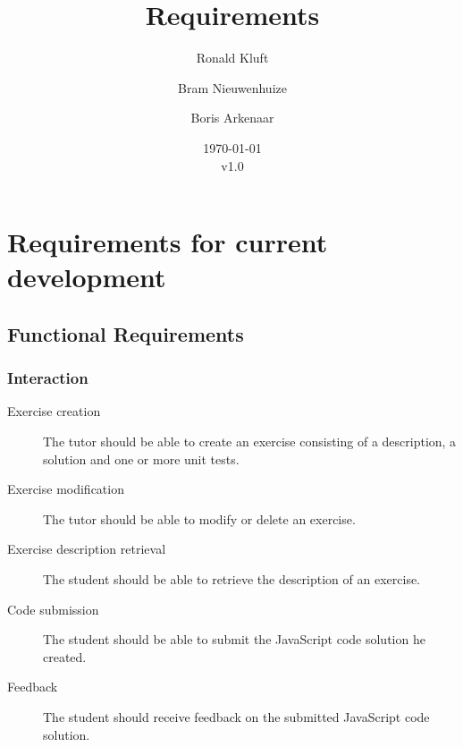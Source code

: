 \documentclass{article}
\begin{document}
\title{Requirements}
\author{Ronald Kluft \and Bram Nieuwenhuize \and Boris Arkenaar}
\date{\today\\v1.0}
\maketitle

\section{Requirements for current development}
\subsection{Functional Requirements}
\subsubsection{Interaction}
\begin{description}
  \item[Exercise creation] The tutor should be able to create an exercise
    consisting of a description, a solution and one or more unit tests.
  \item[Exercise modification] The tutor should be able to modify or delete an
	exercise.
  \item[Exercise description retrieval] The student should be able to retrieve
    the description of an exercise.
  \item[Code submission] The student should be able to submit the JavaScript 
	code solution he created.
  \item[Feedback] The student should receive feedback on the submitted 
	JavaScript code solution. 
\end{description}
\end{document}
